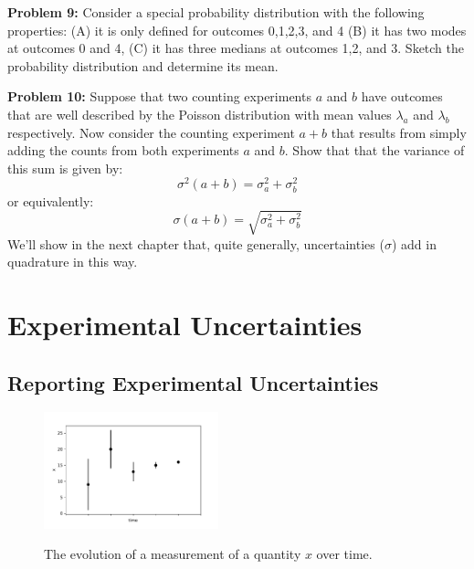 \documentclass[12pt,oneside]{book}
\begin{document}
\vskip 1cm
\noindent
{\bf Problem 9:} Consider a special probability distribution with the
following properties: (A) it is only defined for outcomes 0,1,2,3, and
4 (B) it has two modes at outcomes 0 and 4, (C) it has three medians
at outcomes 1,2, and 3.  Sketch the probability distribution and
determine its mean.

\vskip 1cm
\noindent
{\bf Problem 10:} Suppose that two counting experiments $a$ and $b$ have outcomes that are well described by the Poisson distribution with mean values $\lambda_a$ and $\lambda_b$ respectively.  Now consider the counting
experiment $a+b$ that results from simply adding the counts from both experiments $a$ and $b$.  Show that that the variance of this sum is given by:
\begin{displaymath}
\sigma^2(a+b) = \sigma^2_a + \sigma^2_b
\end{displaymath}
or equivalently:
\begin{displaymath}
\sigma(a+b) = \sqrt{\sigma^2_a + \sigma^2_b}
\end{displaymath}
We'll show in the next chapter that, quite generally, uncertainties ($\sigma$) add in quadrature in this way.

\newpage


\chapter{Experimental Uncertainties}

\section{Reporting Experimental Uncertainties}

\begin{figure}[htbp]
\begin{center}
{\includegraphics[width=0.45\textwidth]{figs/measuretime.pdf}}
\end{center}
\caption{\label{fig:measuretime}  The evolution of a measurement of a quantity $x$ over time.}
\end{figure}
\end{document}

